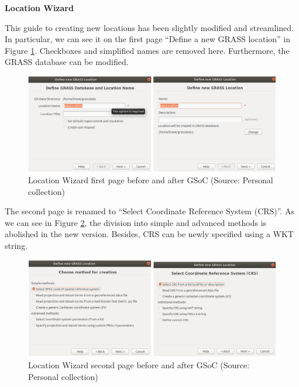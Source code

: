 \documentclass[a4paper,10pt,twoside]{article}
\begin{document}
\bigskip
\noindent \textbf {Location Wizard}

\noindent This guide to creating new locations has been slightly
modified and streamlined. In particular, we can see it on the first
page ``Define a new GRASS location'' in Figure
\ref{fig:loc_wiz_1}. Checkboxes and simplified names are removed
here. Furthermore, the GRASS database can be modified.

\begin{figure}[hbt!] 
\begin{center}
\includegraphics[width=15.5cm]{../pictures/loc_wiz_1.png} 
\caption[Location Wizard first page before and after GSoC]{Location Wizard first page before and after GSoC (Source: Personal collection)}
\label{fig:loc_wiz_1}
\end{center}
\end{figure}

\noindent The second page is renamed to ``Select Coordinate Reference
System (CRS)''. As we can see in Figure \ref{fig:loc_wiz_2}, the
division into simple and advanced methods is abolished in the new
version. Besides, CRS can be newly specified using a WKT string.

\begin{figure}[hbt!] 
\begin{center}
\includegraphics[width=15.5cm]{../pictures/loc_wiz_2.png} 
\caption[Location Wizard second page before and after GSoC]{Location Wizard second page before and after GSoC (Source: Personal collection)}
\label{fig:loc_wiz_2}
\end{center}
\end{figure}
\end{document}
